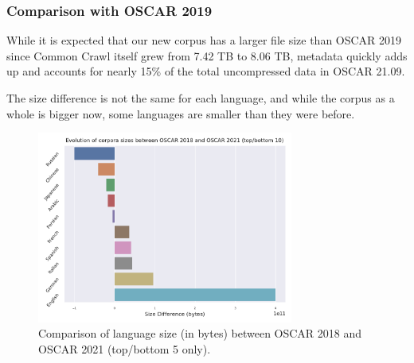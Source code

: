 \subsubsection{Comparison with OSCAR 2019}

While it is expected that our new corpus has a larger file size than OSCAR 2019 since Common Crawl itself grew from 7.42 TB to 8.06 TB, metadata quickly adds up and accounts for nearly 15\% of the total uncompressed data in OSCAR 21.09.

\begin{table}[t]
    \centering\small
    \caption{Comparison of the size of the Common Crawl dumps and their corresponding OSCAR sizes between the 2019 and the 21.09 versions. Compressed (Common Crawl) sources are from November 2018 and February 2021 dumps. Total is Textual + Metadata without deduplication.}
    \label{tab:oscar-size}
\end{table}

The size difference is not the same for each language, and while the corpus as a whole is bigger now, some languages are smaller than they were before.

\begin{figure}[ht]
    \centering
    \includegraphics[width=0.75\textwidth, angle=0]{static/media/oscar/ungoliant/size_evo}
    \caption{Comparison of language size (in bytes) between OSCAR 2018 and OSCAR 2021 (top/bottom 5 only). }
    \label{fig:lang-size}
\end{figure}

